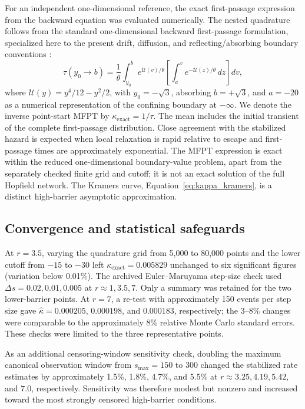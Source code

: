\documentclass[a4paper,twocolumn,10pt]{article}
\begin{document}
For an independent one-dimensional reference, the exact first-passage expression from the backward
equation was evaluated numerically. The nested quadrature follows from the standard one-dimensional
backward first-passage formulation, specialized here to the present drift, diffusion, and
reflecting/absorbing boundary conventions \citep{szabo1980firstpassage}:
\begin{equation}
\tau(y_0\!\to b)=\frac1\theta\int_{y_0}^{b} e^{\mathcal{U}(v)/\theta}
\left[\int_a^v e^{-\mathcal{U}(z)/\theta}\,dz\right]dv,
\label{eq:exact_mfpt}
\end{equation}
where $\mathcal{U}(y)=y^4/12-y^2/2$, with $y_0=-\sqrt3$, absorbing $b=+\sqrt3$, and $a=-20$ as a numerical representation of the confining
boundary at $-\infty$. We denote the inverse point-start MFPT by
$\kappa_{\mathrm{exact}}=1/\tau$. The mean includes the initial transient of the complete
first-passage distribution. Close agreement with the stabilized hazard is expected when local
relaxation is rapid relative to escape and first-passage times are approximately exponential.
The MFPT expression is exact within the reduced one-dimensional boundary-value
problem, apart from the separately checked finite grid and cutoff; it is not an exact solution of
the full Hopfield network. The Kramers curve, Equation~\eqref{eq:kappa_kramers}, is a distinct
high-barrier asymptotic approximation.

\subsection{Convergence and statistical safeguards}

At $r=3.5$, varying the quadrature grid from 5,000 to 80,000 points and the lower cutoff from
$-15$ to $-30$ left $\kappa_{\mathrm{exact}}=0.005829$ unchanged to six significant figures
(variation below 0.01\%). The archived Euler--Maruyama step-size check used
$\Delta s=0.02,0.01,0.005$ at $r\approx1,3.5,7$. Only a summary was retained for the two
lower-barrier points. At $r=7$, a re-test with approximately 150
events per step size gave $\widehat\kappa=0.000205$, $0.000198$, and $0.000183$, respectively;
the 3--8\% changes were comparable to the approximately 8\% relative Monte Carlo standard errors.
These checks were limited to the three representative points.

As an additional censoring-window sensitivity check, doubling the maximum canonical observation
window from $s_{\max}=150$ to $300$ changed the stabilized rate estimates by approximately 1.5\%,
1.8\%, 4.7\%, and 5.5\% at $r\approx3.25,4.19,5.42$, and $7.0$, respectively. Sensitivity was
therefore modest but nonzero and increased toward the most strongly censored high-barrier conditions.
\end{document}

